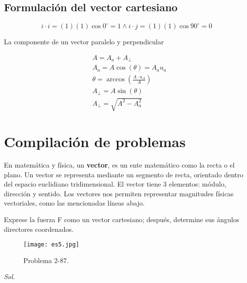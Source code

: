 \subsection{Formulación del vector cartesiano}

\begin{equation}
	i\cdot i=(1)(1)\cos 0^{\circ}=1\land i\cdot j=(1)(1)\cos 90^{\circ}=0
\end{equation}

La componente de un vector paralelo y perpendicular

\begin{align}
	 & A=A_a+A_{\perp}                                  \\
	 & A_a=A\cos(\theta)=A_a u_a                        \\
	 & \theta=\arccos \left(\frac{A\cdot u_A}{A}\right) \\
	 & A_{\perp}=A\sin(\theta)                          \\
	 & A_{\perp}=\sqrt{A^2-A^2_a}
\end{align}

\section{Compilación de problemas}

En matemática y física, un \textbf{vector}, es un ente matemático como la recta
o el plano. Un vector se representa mediante un segmento de recta, orientado
dentro del espacio euclidiano tridimensional. El vector tiene 3 elementos:
módulo, dirección y sentido. Los vectores nos permiten representar magnitudes
físicas vectoriales, como las mencionadas líneas abajo.

\begin{problem}
Exprese la fuerza F como un vector cartesiano; después, determine sus ángulos directores coordenados.
\end{problem}

\begin{figure}[h!]
	\centering
	\texttt{[image: es5.jpg]}
	\caption{Problema 2-87.}
	\label{es5pdf}
\end{figure}

\textit{ Sol.}

